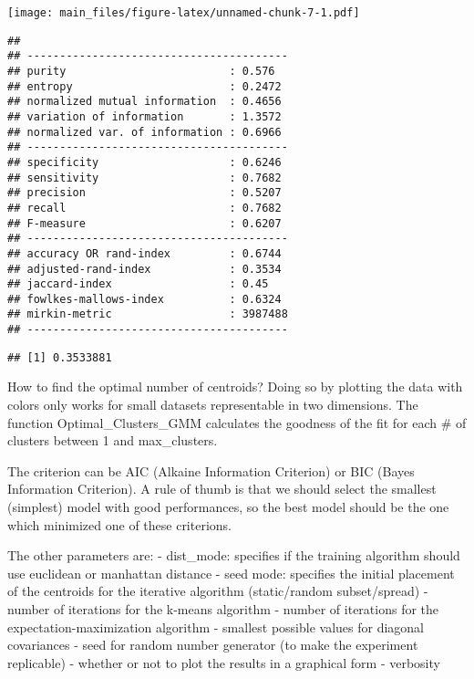 \documentclass[
]{article}
\newenvironment{Shaded}{\begin{snugshade}}{\end{snugshade}}
\newcommand{\AttributeTok}[1]{\textcolor[rgb]{0.77,0.63,0.00}{#1}}
\newcommand{\FunctionTok}[1]{\textcolor[rgb]{0.00,0.00,0.00}{#1}}
\newcommand{\NormalTok}[1]{#1}
\newcommand{\SpecialCharTok}[1]{\textcolor[rgb]{0.00,0.00,0.00}{#1}}
\begin{document}
\texttt{[image: main\_files/figure-latex/unnamed-chunk-7-1.pdf]}

\begin{Shaded}
\end{Shaded}

\begin{verbatim}
##  
## ---------------------------------------- 
## purity                         : 0.576 
## entropy                        : 0.2472 
## normalized mutual information  : 0.4656 
## variation of information       : 1.3572 
## normalized var. of information : 0.6966 
## ---------------------------------------- 
## specificity                    : 0.6246 
## sensitivity                    : 0.7682 
## precision                      : 0.5207 
## recall                         : 0.7682 
## F-measure                      : 0.6207 
## ---------------------------------------- 
## accuracy OR rand-index         : 0.6744 
## adjusted-rand-index            : 0.3534 
## jaccard-index                  : 0.45 
## fowlkes-mallows-index          : 0.6324 
## mirkin-metric                  : 3987488 
## ----------------------------------------
\end{verbatim}

\begin{verbatim}
## [1] 0.3533881
\end{verbatim}

How to find the optimal number of centroids? Doing so by plotting the
data with colors only works for small datasets representable in two
dimensions. The function Optimal\_Clusters\_GMM calculates the goodness
of the fit for each \# of clusters between 1 and max\_clusters.

The criterion can be AIC (Alkaine Information Criterion) or BIC (Bayes
Information Criterion). A rule of thumb is that we should select the
smallest (simplest) model with good performances, so the best model
should be the one which minimized one of these criterions.

The other parameters are: - dist\_mode: specifies if the training
algorithm should use euclidean or manhattan distance - seed mode:
specifies the initial placement of the centroids for the iterative
algorithm (static/random subset/spread) - number of iterations for the
k-means algorithm - number of iterations for the
expectation-maximization algorithm - smallest possible values for
diagonal covariances - seed for random number generator (to make the
experiment replicable) - whether or not to plot the results in a
graphical form - verbosity
\end{document}
